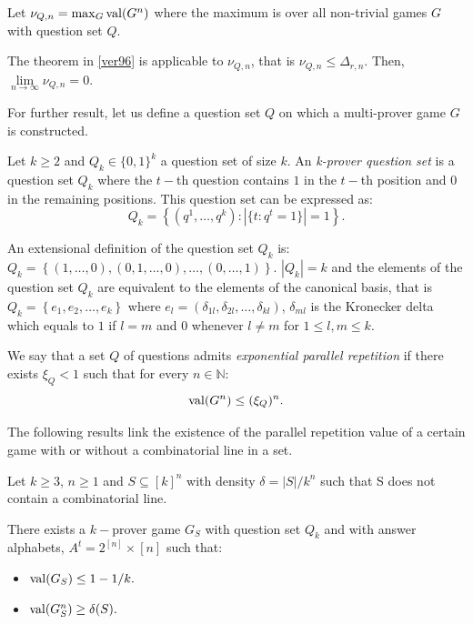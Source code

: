 Let $\nu_{Q,n}=\max_G \mathrm{val} (G^n)$ where the maximum is over all non-trivial games $G$ with question set $Q.$

The theorem in \eqref{ver96} is applicable to $\nu_{Q,n}$, that is $\nu_{Q,n} \leq \Delta_{r,n}.$ Then, $\lim\limits_{n\longrightarrow \infty} \nu_{Q,n}=0.$

For further result, let us define a question set $Q$ on which a multi-prover game $G$ is constructed.

\begin{defn}Let $k\geq 2$ and $Q_k \in \{0,1\}^k$ a question set of size $k.$ An \textit{k-prover question set} is a question set $Q_k$ where the $t-$th question contains $1$ in the $t-$th position and $0$ in the remaining positions. This question set can be expressed as:
$$Q_k=\left\lbrace(q^1, \ldots, q^k): |\{t:q^t=1\}|=1\right\rbrace.$$		\end{defn}
 
 An extensional definition of the question set $Q_k$ is: $Q_k=\left\lbrace (1,\ldots,0), (0,1,\ldots,0), \ldots, (0,\ldots,1) \right\rbrace.$ $|Q_k|=k$ and the elements of the question set $Q_k$ are equivalent to the elements of the canonical basis, that is $Q_k= \left\lbrace e_1, e_2, \ldots, e_k\right\rbrace$ where $e_l=(\delta_{1l}, \delta_{2l}, \ldots, \delta_{kl} )$, $\delta_{ml}$ is the Kronecker delta which equals to $1$ if $l=m$ and $0$ whenever $l \neq m$ for $1 \leq l, m \leq  k.$ 
 
 
We say that a set $Q$ of questions admits
\textit{exponential parallel repetition} if there exists $\xi_Q < 1$ such that for every $n \in \mathbb{N}$: $$\mathrm{val} (G^n) \leq (\xi_Q)^n.$$
 
The following results link the existence of the parallel repetition value of a certain game with or without a  combinatorial line in a set.
 
 \begin{thm} Let $k\geq 3$, $n\geq 1$ and $S\subseteq [k]^n$ with density $\delta=|S|/k^n$ such that S does not contain a combinatorial line.	
 
There exists a $k-$prover game $G_S$ with question set $Q_k$ and with answer alphabets,
$A^t = 2^{[n]} \times [n]$ such that:
\begin{itemize}
\item $\mathrm{val} (G_S) \leq 1-1/k.$ 	\item $\mathrm{val} (G_S^n) \geq \delta(S).$
\end{itemize} \label{hka}
 	\end{thm}
 
